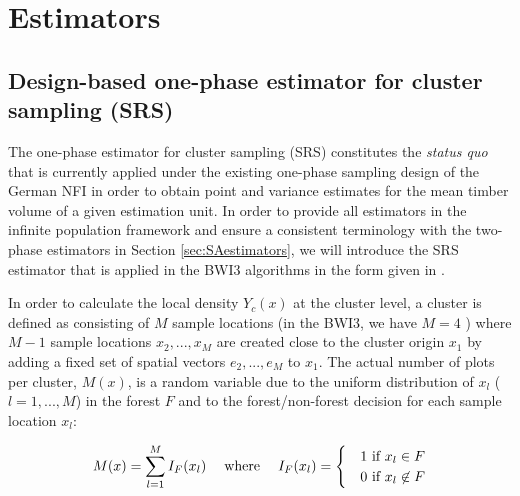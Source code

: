 
\section{Estimators}
\label{sec:estimators}


\subsection{Design-based one-phase estimator for cluster sampling (SRS)}
\label{sec:srs_estimator}

The one-phase estimator for cluster sampling (SRS) constitutes the \textit{status quo} that is currently applied under the existing one-phase sampling design of the German NFI in order to obtain point and variance estimates for the mean timber volume of a given estimation unit. In order to provide all estimators in the infinite population framework and ensure a consistent terminology with the two-phase estimators in Section \ref{sec:SAestimators}, we will introduce the SRS estimator that is applied in the BWI3 algorithms \citep{bwi3_ausw} in the form given in \citet{mandallaz2008, mandallaz2016}.\par 
In order to calculate the local density $Y_{c}(x)$ at the cluster level, a cluster is defined as consisting of $M$ sample locations (in the BWI3, we have $M=4$ ) where $M-1$ sample locations $x_2, ..., x_M$ are created close to the cluster origin $x_1$ by adding a fixed set of spatial vectors $e_2, ..., e_M$ to $x_1$. The actual number of plots per cluster, $M(x)$, is a random variable due to the uniform distribution of $x_l$ ($l=1, ..., M$) in the forest $F$ and to the forest/non-forest decision for each sample location $x_l$:

\begin{equation}\label{eq:Mx}
M(x)=\sum_{l=1}^{M}I_{F}(x_l) \hspace{3ex} \text{where} \hspace{3ex} I_F(x_l)=\begin{cases}&1 \text{ if $x_l \in F$}\\
&0 \text{ if $x_l\not\in F$}
\end{cases}
\end{equation}

